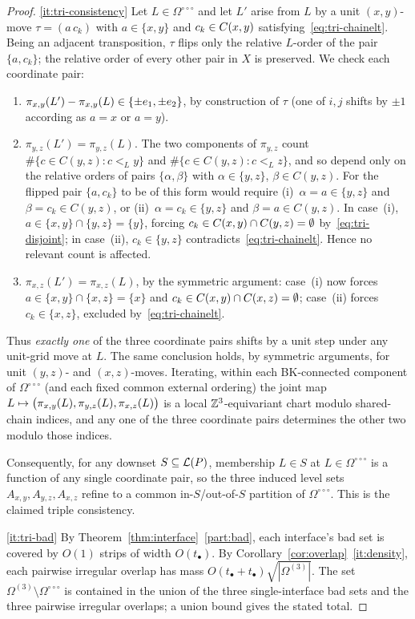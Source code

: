 \begin{proof}
\ref{it:tri-consistency} Let $L\in\Omega^{\circ\circ\circ}$ and let $L'$
arise from $L$ by a unit $(x,y)$-move $\tau=(a\,c_k)$ with $a\in\{x,y\}$
and $c_k\in C(x,y)$ satisfying~\eqref{eq:tri-chainelt}. Being an adjacent
transposition, $\tau$ flips only the relative $L$-order of the pair
$\{a,c_k\}$; the relative order of every other pair in $X$ is preserved.
We check each coordinate pair:
\begin{enumerate}[label=(\roman*),nosep,leftmargin=*]
\item $\pi_{x,y}(L')-\pi_{x,y}(L)\in\{\pm e_1,\pm e_2\}$, by construction of $\tau$
(one of $i,j$ shifts by $\pm1$ according as $a=x$ or $a=y$).
\item $\pi_{y,z}(L')=\pi_{y,z}(L)$. The two components of $\pi_{y,z}$ count
$\#\{c\in C(y,z):c<_L y\}$ and $\#\{c\in C(y,z):c<_L z\}$, and so depend
only on the relative orders of pairs $\{\alpha,\beta\}$ with
$\alpha\in\{y,z\}$, $\beta\in C(y,z)$. For the flipped pair $\{a,c_k\}$ to
be of this form would require (i)~$\alpha=a\in\{y,z\}$ and
$\beta=c_k\in C(y,z)$, or (ii)~$\alpha=c_k\in\{y,z\}$ and
$\beta=a\in C(y,z)$. In case~(i), $a\in\{x,y\}\cap\{y,z\}=\{y\}$, forcing
$c_k\in C(x,y)\cap C(y,z)=\emptyset$ by~\eqref{eq:tri-disjoint}; in case~(ii),
$c_k\in\{y,z\}$ contradicts~\eqref{eq:tri-chainelt}. Hence no relevant
count is affected.
\item $\pi_{x,z}(L')=\pi_{x,z}(L)$, by the symmetric argument: case~(i) now
forces $a\in\{x,y\}\cap\{x,z\}=\{x\}$ and $c_k\in C(x,y)\cap C(x,z)=\emptyset$;
case~(ii) forces $c_k\in\{x,z\}$, excluded by~\eqref{eq:tri-chainelt}.
\end{enumerate}
Thus \emph{exactly one} of the three coordinate pairs shifts by a unit
step under any unit-grid move at $L$. The same conclusion holds, by
symmetric arguments, for unit $(y,z)$- and $(x,z)$-moves. Iterating, within
each BK-connected component of $\Omega^{\circ\circ\circ}$ (and each fixed
common external ordering) the joint map
$L\mapsto\bigl(\pi_{x,y}(L),\pi_{y,z}(L),\pi_{x,z}(L)\bigr)$ is a local
$\mathbb{Z}^3$-equivariant chart modulo shared-chain indices, and any one of the
three coordinate pairs determines the other two modulo those indices.

Consequently, for any downset $S\subseteq\mathcal{L}(P)$, membership $L\in S$ at
$L\in\Omega^{\circ\circ\circ}$ is a function of any single coordinate pair,
so the three induced level sets $A_{x,y},A_{y,z},A_{x,z}$ refine to a
common in-$S$/out-of-$S$ partition of $\Omega^{\circ\circ\circ}$. This is
the claimed triple consistency.

\ref{it:tri-bad} By Theorem~\ref{thm:interface}~\ref{part:bad}, each
interface's bad set is covered by $O(1)$ strips of width $O(t_\bullet)$.
By Corollary~\ref{cor:overlap}~\ref{it:density}, each pairwise irregular
overlap has mass $O(t_\bullet+t_\bullet)\sqrt{|\Omega^{(3)}|}$. The set
$\Omega^{(3)}\setminus\Omega^{\circ\circ\circ}$ is contained in the union
of the three single-interface bad sets and the three pairwise irregular
overlaps; a union bound gives the stated total.
\end{proof}


